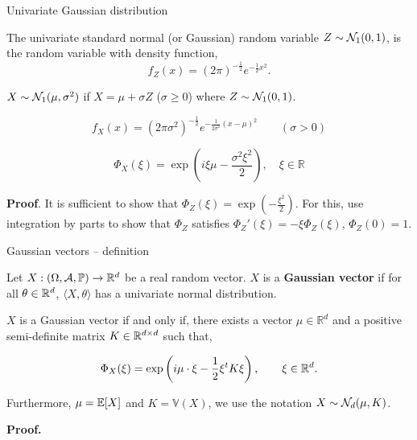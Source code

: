 \documentclass[handout, 10pt]{beamer} %
\begin{document}
  \begin{frame}{Univariate Gaussian distribution}

    The univariate standard normal (or Gaussian) random variable  $Z \sim
    \mathcal{N}_1(0,1)$, is the random variable with density function,
    $$f_Z(x)=(2\pi)^{-\frac{1}{2}} e^{-\frac{1}{2}x^{2}}.$$

    \pause

    $X \sim \mathcal{N}_1(\mu,\sigma^2)$ if $X = \mu + \sigma Z$
    ($\sigma \geq 0$) where  $Z \sim \mathcal{N}_1(0,1)$.

    $$f_X(x)=(2
    \pi\sigma^2)^{-\frac{1}{2}} e^{-\frac{1}{2\sigma^2}(x-\mu)^{2}} \qquad
    (\sigma > 0) $$

    \pause

      $$
      \boxed{\Phi_{X}(\xi)=\exp \left(i\xi \mu -\frac{\sigma^{2} \xi^{2}}{2}\right), \quad \xi \in \mathbb{R}}
      $$

      \pause

      \textbf{Proof}. It is sufficient to show that $\Phi_{Z}(\xi)=\exp
      \left(-\frac{\xi^{2}}{2}\right)$. For this, use integration by parts to
      show that $\Phi_Z$ satisfies $\Phi_Z'(\xi) = -\xi\Phi_Z(\xi)$, $\Phi_Z(0) =
      1$.
  \end{frame}

  \begin{frame}{Gaussian vectors -- definition}
    \begin{definition}
      Let $X:(\Omega,\mathcal{A},\mathbb{P}) \to \mathbb{R}^{d}$ be a real random vector. $X$ is a \textbf{Gaussian
        vector} if for all $\theta \in \mathbb{R}^{d}$, $\langle X, \theta \rangle$ has a
      univariate normal distribution.
    \end{definition}

    \pause

    \begin{theorem} $X$ is a Gaussian vector if and only if, there exists a
      vector $\mu \in \mathbb{R}^{d}$ and a positive semi-definite matrix $K \in \mathbb{R}^{d \times d}$ such that,

      \begin{equation}
        \Phi_{X}(\xi)=\exp \left(i \mu \cdot \xi-\frac{1}{2} \xi^t K \xi\right),
        \qquad \xi \in \mathbb{R}^{d}.
      \end{equation}

      Furthermore, $\mu = \mathbb{E}[X]$ and $K = \mathbb{V}(X)$, we use the notation
      $X \sim \mathcal{N}_d(\mu,K)$.
    \end{theorem}

    \pause
    \textbf{Proof.}
  \end{frame}
\end{document}
